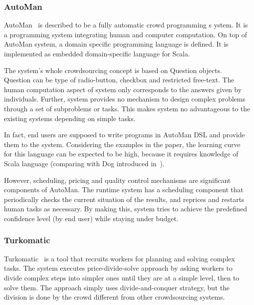 
\subsubsection{AutoMan}
AutoMan~\cite{Barowy2012} is described to be a fully automatic crowd programming s
ystem. It is a programming system integrating human and computer computation. 
On top of AutoMan system, a domain specific programming language is defined. 
It is implemented as embedded domain-specific language for Scala.

The system's whole crowdsourcing concept is based on Question objects. 
Question can be type of radio-button, checkbox and restricted free-text. The human 
computation aspect of system only corresponds to the answers given by individuals. 
Further, system provides no mechanism to design complex problems through a 
set of subproblems or tasks. This makes system no advantageous to the 
existing systems depending on simple tasks.

In fact, end users are supposed to write programs in AutoMan DSL and provide 
them to the system. Considering the examples in the paper, the learning curve 
for this language can be expected to be high, because it requires knowledge 
of Scala language (comparing with Dog introduced in~\cite{Ahmad2011}).

However, scheduling, pricing and quality control mechanisms are significant 
components of AutoMan. The runtime system has a scheduling component that 
periodically checks the current situation of the results, and reprices and restarts 
human tasks as necessary. By making this, system tries to achieve the predefined 
confidence level (by end user) while staying under budget.


\subsubsection{Turkomatic}
Turkomatic~\cite{Kulkarni2012} is a tool that recruits workers for planning and 
solving complex tasks. The system executes price-divide-solve approach by 
asking workers to divide complex steps into simpler ones until they are at a simple 
level, then to solve them. The approach simply uses divide-and-conquer strategy, 
but the division is done by the crowd different from other crowdsourcing systems.


